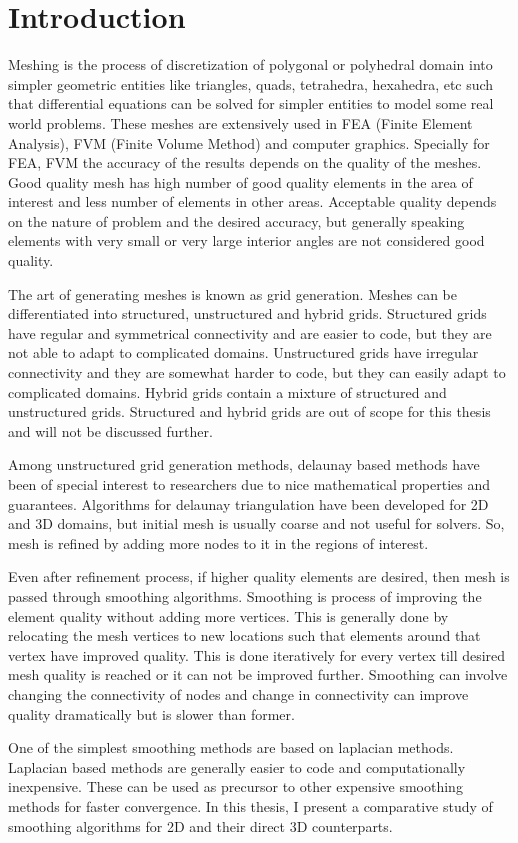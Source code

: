 \chapter{Introduction}
Meshing is the process of discretization of polygonal or polyhedral domain into simpler geometric entities like triangles, quads, tetrahedra, hexahedra, etc such that differential equations can be solved for simpler entities to model some real world problems. These meshes are extensively used in FEA (Finite Element Analysis), FVM (Finite Volume Method) and computer graphics. Specially for FEA, FVM the accuracy of the results depends on the quality of the meshes. Good quality mesh has high number of good quality elements in the area of interest and less number of elements in other areas. Acceptable quality depends on the nature of problem and the desired accuracy, but generally speaking elements with very small or very large interior angles are not considered good quality.

The art of generating meshes is known as grid generation. Meshes can be differentiated into structured, unstructured and hybrid grids. Structured grids have regular and symmetrical connectivity and are easier to code, but they are not able to adapt to complicated domains. Unstructured grids have irregular connectivity and they are somewhat harder to code, but they can easily adapt to complicated domains. Hybrid grids contain a mixture of structured and unstructured grids. Structured and hybrid grids are out of scope for this thesis and will not be discussed further.

Among unstructured grid generation methods, delaunay based methods have been of special interest to researchers due to nice mathematical properties and guarantees. Algorithms for delaunay triangulation have been developed for 2D and 3D domains, but initial mesh is usually coarse and not useful for solvers. So, mesh is refined by adding more nodes to it in the regions of interest. 

Even after refinement process, if higher quality elements are desired, then mesh is passed through smoothing algorithms. Smoothing is process of improving the element quality without adding more vertices. This is generally done by relocating the mesh vertices to new locations such that elements around that vertex have improved quality. This is done iteratively for every vertex till desired mesh quality is reached or it can not be improved further. Smoothing can involve changing the connectivity of nodes and change in connectivity can improve quality dramatically but is slower than former.

One of the simplest smoothing methods are based on laplacian methods. Laplacian based methods are generally easier to code and computationally inexpensive. These can be used as precursor to other expensive smoothing methods for faster convergence.
In this thesis, I present a comparative study of smoothing algorithms for 2D and their direct 3D counterparts. 

